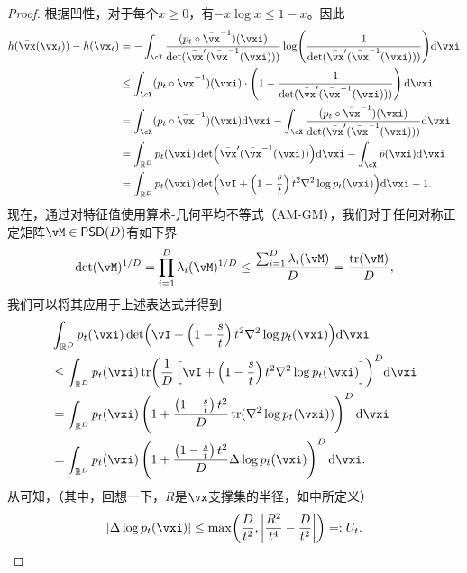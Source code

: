 \documentclass[../../book-main.tex]{subfiles}
\begin{document}
\begin{proof}
    根据凹性，对于每个\(x \geq 0\)，有\(-x\log x \leq 1 - x\)。因此
    \begin{align}
        h(\bar{\vx}(\vx_{t})) - h(\vx_{t})
        &= - \int_{\cX}\frac{(p_{t} \circ \bar{\vx}^{-1})(\vxi)}{\det(\bar{\vx}^{\prime}(\bar{\vx}^{-1}(\vxi)))}\log\rp{\frac{1}{\det(\bar{\vx}^{\prime}(\bar{\vx}^{-1}(\vxi)))}}\odif{\vxi} \\ 
        &\leq  \int_{\cX}(p_{t} \circ \bar{\vx}^{-1})(\vxi)\cdot \bp{1 - \frac{1}{\det(\bar{\vx}^{\prime}(\bar{\vx}^{-1}(\vxi)))}}\odif{\vxi} \\ 
        &= \int_{\cX}(p_{t} \circ \bar{\vx}^{-1})(\vxi)\odif{\vxi} - \int_{\cX}\frac{(p_{t} \circ \bar{\vx}^{-1})(\vxi)}{\det(\bar{\vx}^{\prime}(\bar{\vx}^{-1}(\vxi)))}\odif{\vxi} \\
        &= \int_{\R^{D}}p_{t}(\vxi)\det\rp{\bar{\vx}^{\prime}(\bar{\vx}^{-1}(\vxi))}\odif{\vxi} - \int_{\cX}\bar{p}(\vxi)\odif{\vxi} \\
        &= \int_{\R^{D}}p_{t}(\vxi)\det\rp{\vI + \bp{1 - \frac{s}{t}}t^{2}\nabla^{2}\log p_{t}(\vxi)}\odif{\vxi} - 1.
    \end{align}
    现在，通过对特征值使用算术-几何平均不等式（AM-GM），我们对于任何对称正定矩阵\(\vM \in \PSD(D)\)有如下界
    \begin{equation}
        \det(\vM)^{1/D} = \prod_{i = 1}^{D}\lambda_{i}(\vM)^{1/D} \leq \frac{\sum_{i = 1}^{D}\lambda_{i}(\vM)}{D} = \frac{\tr(\vM)}{D},
    \end{equation}
    我们可以将其应用于上述表达式并得到
    \begin{align}
        &\int_{\R^{D}}p_{t}(\vxi)\det\rp{\vI + \bp{1 - \frac{s}{t}}t^{2}\nabla^{2}\log p_{t}(\vxi)}\odif{\vxi} \\
        &\leq \int_{\R^{D}} p_{t}(\vxi) \tr\rp{\frac{1}{D}\bs{\vI + \bp{1 - \frac{s}{t}}t^{2}\nabla^{2}\log p_{t}(\vxi)}}^{D}\odif{\vxi} \\
        &= \int_{\R^{D}} p_{t}(\vxi)\bp{1 + \frac{\bp{1 - \frac{s}{t}}t^{2}}{D}\tr(\nabla^{2}\log p_{t}(\vxi))}^{D}\odif{\vxi} \\
        &= \int_{\R^{D}} p_{t}(\vxi)\bp{1 + \frac{\bp{1 - \frac{s}{t}}t^{2}}{D}\Delta \log p_{t}(\vxi)}^{D}\odif{\vxi}.
    \end{align}
    从可知，（其中，回想一下，\(R\)是\(\vx\)支撑集的半径，如中所定义）
    \begin{equation}
        \abs{\Delta \log p_{t}(\vxi)} \leq \max\rp{\frac{D}{t^{2}}, \abs*{\frac{R^{2}}{t^{4}} - \frac{D}{t^{2}}}} =: U_{t}.

\end{equation}
\end{proof}
\end{document}
